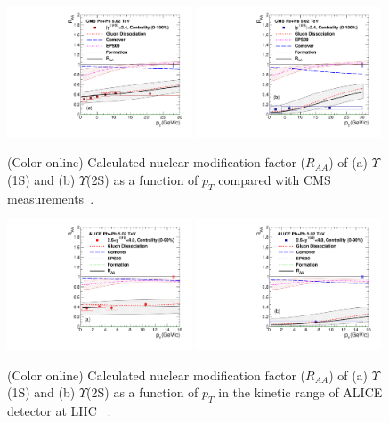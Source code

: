 \documentclass[12pt,a4paper,final]{iopart} %
\begin{document}
\begin{figure}
\includegraphics[width=0.49\textwidth]{Fig7a_Y1S_CMS_RAAPt_Shade.pdf}
\includegraphics[width=0.49\textwidth]{Fig7b_Y2S_CMS_RAAPt_Shade.pdf}
\caption{(Color online) Calculated nuclear modification factor ($R_{AA}$) of (a) $\Upsilon$(1S) and 
  (b) $\Upsilon$(2S) as a function of $p_{T}$ 
  compared with CMS measurements~\cite{CMS:2017ucd}.}
\label{fig:UpsilonRaaPtCMS}
\end{figure}



\begin{figure}
\includegraphics[width=0.49\textwidth]{Fig8a_ALICE_Y1SRAAPt_Shade.pdf}
\includegraphics[width=0.49\textwidth]{Fig8b_ALICE_Y2SRAAPt_Shade.pdf}
\caption{(Color online) Calculated nuclear modification factor ($R_{AA}$) of (a) $\Upsilon$(1S) and 
  (b) $\Upsilon$(2S) as a function of $p_{T}$ in the kinetic range of ALICE detector at LHC ~\cite{ALICE:Y5TeV}.} 
  
\label{fig:UpsilonRaaPtALICE}
\end{figure}
\end{document}
